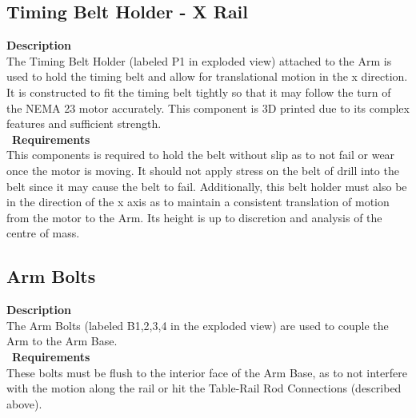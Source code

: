 \documentclass[titlepage]{article}
\begin{document}
\subsection{Timing Belt Holder - X Rail}
\textbf{Description}\\
The Timing Belt Holder (labeled P1 in exploded view) attached to the Arm is used to hold the timing belt and allow for translational motion in the x direction. It is constructed to fit the timing belt tightly so that it may follow the turn of the NEMA 23 motor accurately. This component is 3D printed due to its complex features and sufficient strength.\\\
\textbf{Requirements}\\
This components is required to hold the belt without slip as to not fail or wear once the motor is moving. It should not apply stress on the belt of drill into the belt since it may cause the belt to fail. Additionally, this belt holder must also be in the direction of the x axis as to maintain a consistent translation of motion from the motor to the Arm. Its height is up to discretion and analysis of the centre of mass.

\subsection{Arm Bolts}
\textbf{Description}\\
The Arm Bolts (labeled B1,2,3,4 in the exploded view) are used to couple the Arm to the Arm Base.\\\
\textbf{Requirements}\\
These bolts must be flush to the interior face of the Arm Base, as to not interfere with the motion along the rail or hit the Table-Rail Rod Connections (described above).

\newpage
\end{document}
